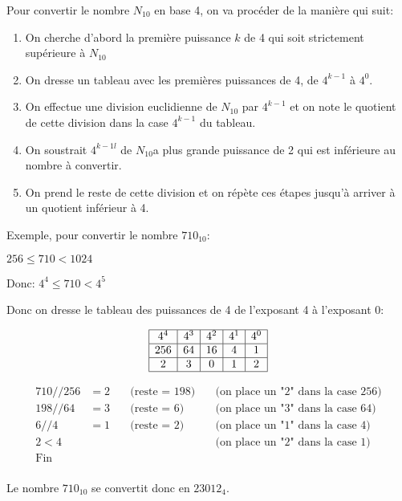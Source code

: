 \documentclass[12pt]{article}
\begin{document}
	\begin{MaReponse}
		Pour convertir le nombre $N_{10}$ en base 4, on va procéder de la manière qui suit:
		\begin{enumerate}
			\item On cherche d'abord la première puissance $k$ de 4 qui soit strictement supérieure à $N_{10}$
			\item On dresse un tableau avec les premières puissances de 4, de $4^{k-1}$ à $4^0$.
			\item On effectue une division euclidienne de $N_{10}$ par $4^{k-1}$ et on note le quotient de cette division dans la case $4^{k-1}$ du tableau.
			\item On soustrait $4^{k-1l}$ de $N_{10}$a plus grande puissance de 2 qui est inférieure au nombre à convertir.
			\item On prend le reste de cette division et on répète ces étapes jusqu'à arriver à un quotient inférieur à 4.
		\end{enumerate}

		Exemple, pour convertir le nombre $710_{10}$:
		
		$256 \le 710 < 1024$

		Donc: $4^4 \le 710 < 4^5$
		
		Donc on dresse le tableau des puissances de 4 de l'exposant 4 à l'exposant 0:
		
		\[
		\begin{array}{|c|c|c|c|c|c|c|}
		\hline
		4^4 & 4^3 & 4^2 & 4^1 & 4^0 \\
		\hline
		256 & 64 & 16 & 4 & 1 \\
		\hline
		2 & 3 & 0 & 1 & 2 \\
		\hline
		\end{array}
		\]
		
		\[
		\begin{array}{llll}
		710 // 256 &= 2 &\quad \text{(reste = } 198 \text{)} &\quad \text{(on place un "2" dans la case \(256\))} \\
		198 // 64 &= 3 &\quad \text{(reste = } 6 \text{)} &\quad \text{(on place un "3" dans la case \(64\))} \\
		6 // 4 &= 1 &\quad \text{(reste = } 2 \text{)} &\quad \text{(on place un "1" dans la case \(4\))} \\
		2 < 4 &&&\quad \text{(on place un "2" dans la case \(1\))} \\
		\text{Fin} & \\
		\end{array}
		\]
		
		Le nombre \(710_{10}\) se convertit donc en \(23012_{4}\).
		
	\end{MaReponse}
		
\end{document}
